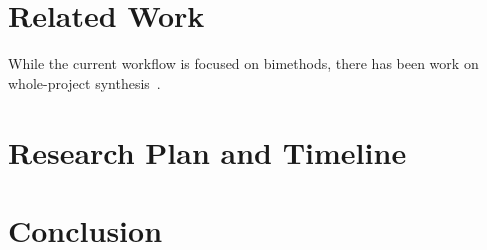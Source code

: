 \documentclass[12pt,letterpaper]{article}
\begin{document}
\section{Related Work}
\label{sec:related}

While the current workflow is focused on bimethods, there has been work on
whole-project synthesis~\cite{zhong_2025_LMPL}.

\section{Research Plan and Timeline}
\label{sec:plan}


\section{Conclusion}
\label{sec:conclusion}



\end{document}
